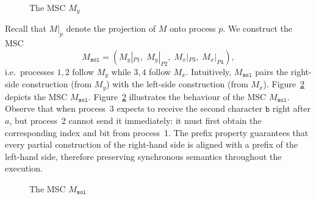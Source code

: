\begin{example}
\begin{figure}[!ht]
\centering
\begin{msc}[draw frame=none, draw head=none, msc keyword=, head height=0px, label distance=0.5ex, foot height=0px, foot distance=0px]{}



\end{msc}
\caption{The MSC $M_y$}
\label{fig:exmp-my}
\end{figure}

Recall that \(M|_p\) denote the projection of \(M\) onto process \(p\). We
construct the MSC
\[
  M_{\texttt{sol}} = (M_y|_{P1},\; M_y|_{P2},\; M_x|_{P3},\; M_x|_{P4}),
\]
i.e.\ processes $1,2$ follow $M_y$ while $3,4$ follow $M_x$.
Intuitively, $M_{\texttt{sol}}$ pairs the right-side construction (from $M_y$)
with the left-side construction (from $M_x$). Figure~\ref{fig:exmp-msol}
depicts the MSC $M_{\texttt{sol}}$.
Figure~\ref{fig:exmp-msol} illustrates the behaviour of the MSC
$M_{\texttt{sol}}$. Observe that when process~3 expects to receive the
second character $\texttt{b}$ right after $a$, 
but process~2 cannot send it immediately:
it must first obtain the corresponding index and bit from process~1.
The prefix property guarantees
that every partial construction of the right-hand side is aligned with
a prefix of the left-hand side, therefore preserving synchronous
semantics throughout the execution.

\begin{figure}[!ht]
\centering
\begin{msc}[draw frame=none, draw head=none, msc keyword=, head height=0px, label distance=0.5ex, foot height=0px, foot distance=0px]{}


	
\end{msc}
\caption{The MSC $M_\texttt{sol}$}
\label{fig:exmp-msol}
\end{figure}

\end{example}

